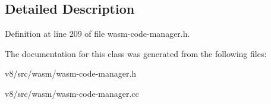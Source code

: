 \subsection{Detailed Description}


Definition at line 209 of file wasm-\/code-\/manager.\+h.



The documentation for this class was generated from the following files\+:\begin{DoxyCompactItemize}
\item 
v8/src/wasm/wasm-\/code-\/manager.\+h\item 
v8/src/wasm/wasm-\/code-\/manager.\+cc\end{DoxyCompactItemize}

